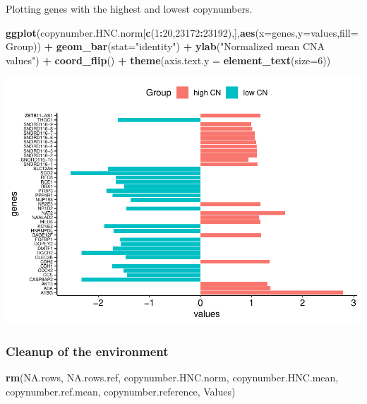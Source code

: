 \documentclass[]{article}
\newenvironment{Shaded}{\begin{snugshade}}{\end{snugshade}}
\newcommand{\KeywordTok}[1]{\textcolor[rgb]{0.13,0.29,0.53}{\textbf{#1}}}
\newcommand{\DataTypeTok}[1]{\textcolor[rgb]{0.13,0.29,0.53}{#1}}
\newcommand{\DecValTok}[1]{\textcolor[rgb]{0.00,0.00,0.81}{#1}}
\newcommand{\StringTok}[1]{\textcolor[rgb]{0.31,0.60,0.02}{#1}}
\newcommand{\OperatorTok}[1]{\textcolor[rgb]{0.81,0.36,0.00}{\textbf{#1}}}
\newcommand{\NormalTok}[1]{#1}
\begin{document}
Plotting genes with the highest and lowest copynumbers.

\begin{Shaded}
\begin{Highlighting}[]
\KeywordTok{ggplot}\NormalTok{(copynumber.HNC.norm[}\KeywordTok{c}\NormalTok{(}\DecValTok{1}\OperatorTok{:}\DecValTok{20}\NormalTok{,}\DecValTok{23172}\OperatorTok{:}\DecValTok{23192}\NormalTok{),],}\KeywordTok{aes}\NormalTok{(}\DataTypeTok{x=}\NormalTok{genes,}\DataTypeTok{y=}\NormalTok{values,}\DataTypeTok{fill=}\NormalTok{Group)) }\OperatorTok{+}
\StringTok{  }\KeywordTok{geom_bar}\NormalTok{(}\DataTypeTok{stat=}\StringTok{"identity"}\NormalTok{) }\OperatorTok{+}
\StringTok{  }\KeywordTok{ylab}\NormalTok{(}\StringTok{"Normalized mean CNA values"}\NormalTok{) }\OperatorTok{+}
\StringTok{  }\KeywordTok{coord_flip}\NormalTok{() }\OperatorTok{+}
\StringTok{  }\KeywordTok{theme}\NormalTok{(}\DataTypeTok{axis.text.y =} \KeywordTok{element_text}\NormalTok{(}\DataTypeTok{size=}\DecValTok{6}\NormalTok{))}
\end{Highlighting}
\end{Shaded}

\includegraphics{Project_HNC_files/figure-latex/1_copynumber_plot-1.pdf}

\subsubsection{Cleanup of the
environment}\label{cleanup-of-the-environment}

\begin{Shaded}
\begin{Highlighting}[]
\KeywordTok{rm}\NormalTok{(NA.rows, NA.rows.ref, copynumber.HNC.norm, copynumber.HNC.mean, copynumber.ref.mean, copynumber.reference, Values)}
\end{Highlighting}
\end{Shaded}
\end{document}
